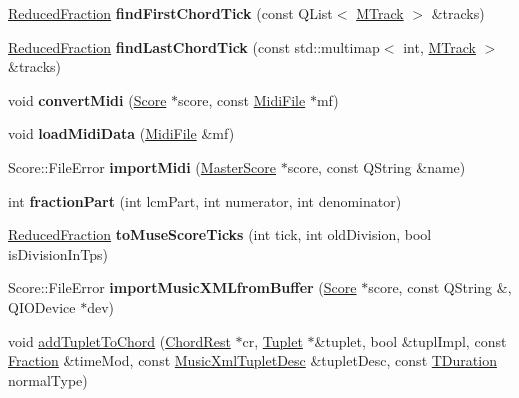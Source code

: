 \begin{DoxyCompactItemize}
\item 
\mbox{\label{namespace_ms_af5cca56f26d6d7e1796ab1441c26af86}} 
\hyperlink{class_ms_1_1_reduced_fraction}{Reduced\+Fraction} {\bfseries find\+First\+Chord\+Tick} (const Q\+List$<$ \hyperlink{class_ms_1_1_m_track}{M\+Track} $>$ \&tracks)
\item 
\mbox{\label{namespace_ms_a6be46bd8bba78c88a56e9c90fa67f3c7}} 
\hyperlink{class_ms_1_1_reduced_fraction}{Reduced\+Fraction} {\bfseries find\+Last\+Chord\+Tick} (const std\+::multimap$<$ int, \hyperlink{class_ms_1_1_m_track}{M\+Track} $>$ \&tracks)
\item 
\mbox{\label{namespace_ms_a372bf4378eb085426993ba446d4f5dc3}} 
void {\bfseries convert\+Midi} (\hyperlink{class_ms_1_1_score}{Score} $\ast$score, const \hyperlink{class_ms_1_1_midi_file}{Midi\+File} $\ast$mf)
\item 
\mbox{\label{namespace_ms_a96df51114ffeed4c719ecbe9ba926d43}} 
void {\bfseries load\+Midi\+Data} (\hyperlink{class_ms_1_1_midi_file}{Midi\+File} \&mf)
\item 
\mbox{\label{namespace_ms_ad65094520812d98ebfbbc18dc6cd07fc}} 
Score\+::\+File\+Error {\bfseries import\+Midi} (\hyperlink{class_ms_1_1_master_score}{Master\+Score} $\ast$score, const Q\+String \&name)
\item 
\mbox{\label{namespace_ms_a59efc2757d0c2af969eb5b72ef7da66c}} 
int {\bfseries fraction\+Part} (int lcm\+Part, int numerator, int denominator)
\item 
\mbox{\label{namespace_ms_a022385da746d9490c1b58ea2ec7d8a0b}} 
\hyperlink{class_ms_1_1_reduced_fraction}{Reduced\+Fraction} {\bfseries to\+Muse\+Score\+Ticks} (int tick, int old\+Division, bool is\+Division\+In\+Tps)
\item 
\mbox{\label{namespace_ms_a3368f7d8e22172a625f9e75afdeb6eac}} 
Score\+::\+File\+Error {\bfseries import\+Music\+X\+M\+Lfrom\+Buffer} (\hyperlink{class_ms_1_1_score}{Score} $\ast$score, const Q\+String \&, Q\+I\+O\+Device $\ast$dev)
\item 
void \hyperlink{namespace_ms_ab9a5f9ffb33e7efbe4fd1ab0273bcb2c}{add\+Tuplet\+To\+Chord} (\hyperlink{class_ms_1_1_chord_rest}{Chord\+Rest} $\ast$cr, \hyperlink{class_ms_1_1_tuplet}{Tuplet} $\ast$\&tuplet, bool \&tupl\+Impl, const \hyperlink{class_ms_1_1_fraction}{Fraction} \&time\+Mod, const \hyperlink{struct_ms_1_1_music_xml_tuplet_desc}{Music\+Xml\+Tuplet\+Desc} \&tuplet\+Desc, const \hyperlink{class_ms_1_1_t_duration}{T\+Duration} normal\+Type)

\end{DoxyCompactItemize}

